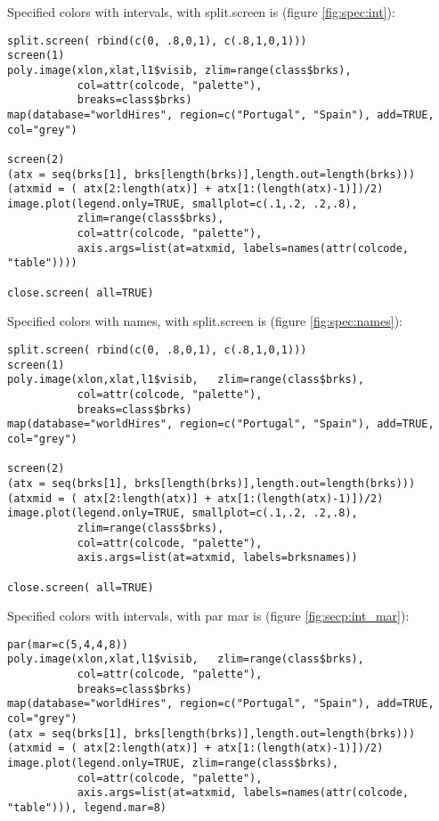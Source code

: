 \documentclass[a4paper,10pt]{article}
\begin{document}
Specified colors with intervals, with split.screen is (figure \ref{fig:spec:int}):

\begin{verbatim}
split.screen( rbind(c(0, .8,0,1), c(.8,1,0,1)))
screen(1)
poly.image(xlon,xlat,l1$visib, zlim=range(class$brks),
           col=attr(colcode, "palette"), 
           breaks=class$brks)
map(database="worldHires", region=c("Portugal", "Spain"), add=TRUE, col="grey")

screen(2)
(atx = seq(brks[1], brks[length(brks)],length.out=length(brks)))
(atxmid = ( atx[2:length(atx)] + atx[1:(length(atx)-1)])/2)
image.plot(legend.only=TRUE, smallplot=c(.1,.2, .2,.8), 
           zlim=range(class$brks), 
           col=attr(colcode, "palette"), 
           axis.args=list(at=atxmid, labels=names(attr(colcode, "table"))))

close.screen( all=TRUE)
\end{verbatim} 

Specified colors with names, with split.screen is (figure \ref{fig:spec:names}):

\begin{verbatim}
split.screen( rbind(c(0, .8,0,1), c(.8,1,0,1)))
screen(1)
poly.image(xlon,xlat,l1$visib,   zlim=range(class$brks),
           col=attr(colcode, "palette"), 
           breaks=class$brks)
map(database="worldHires", region=c("Portugal", "Spain"), add=TRUE, col="grey")

screen(2)
(atx = seq(brks[1], brks[length(brks)],length.out=length(brks)))
(atxmid = ( atx[2:length(atx)] + atx[1:(length(atx)-1)])/2)
image.plot(legend.only=TRUE, smallplot=c(.1,.2, .2,.8), 
           zlim=range(class$brks), 
           col=attr(colcode, "palette"), 
           axis.args=list(at=atxmid, labels=brksnames))

close.screen( all=TRUE)
\end{verbatim} 

Specified colors with intervals, with par mar is (figure \ref{fig:secp:int_mar}):

\begin{verbatim}
par(mar=c(5,4,4,8)) 
poly.image(xlon,xlat,l1$visib,   zlim=range(class$brks),
           col=attr(colcode, "palette"), 
           breaks=class$brks)
map(database="worldHires", region=c("Portugal", "Spain"), add=TRUE, col="grey")
(atx = seq(brks[1], brks[length(brks)],length.out=length(brks)))
(atxmid = ( atx[2:length(atx)] + atx[1:(length(atx)-1)])/2)
image.plot(legend.only=TRUE, zlim=range(class$brks), 
           col=attr(colcode, "palette"), 
           axis.args=list(at=atxmid, labels=names(attr(colcode, "table"))), legend.mar=8)
\end{verbatim} 
\end{document}
